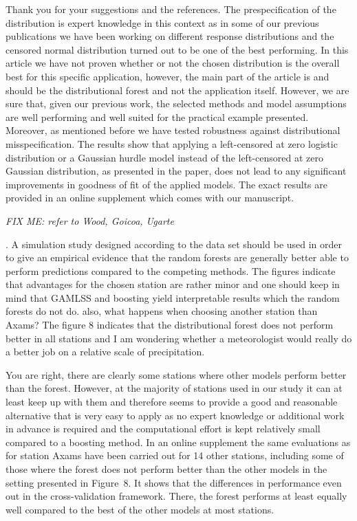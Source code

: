 \documentclass[american,foldmarks=false,noconfig]{uibklttr}
\newenvironment{review}{\fontshape{\itdefault}\fontseries{\bfdefault} \selectfont \smallskip}{\par}
\begin{document}
Thank you for your suggestions and the references. 
The prespecification of the distribution is expert knowledge in 
this context as in some of our previous publications we have been 
working on different response distributions and the censored normal 
distribution turned out to be one of the best performing. In this article 
we have not proven whether or not the chosen distribution is the overall
best for this specific application, however, the main part of the article 
is and should be the distributional forest and not the application itself. 
However, we are sure that, given our previous work, the selected methods 
and model assumptions are well performing and well suited for the practical 
example presented.
Moreover, as mentioned before we have tested robustness against 
distributional misspecification. The results show that applying a 
left-censored at zero logistic distribution or a Gaussian hurdle model 
instead of the left-censored at zero Gaussian distribution, as presented 
in the paper, does not lead to any significant improvements in goodness of 
fit of the applied models. The exact results are provided in an online 
supplement which comes with our manuscript.

\textit{FIX ME: refer to Wood, Goicoa, Ugarte}


\begin{review}
6. A simulation study designed according to the data set should 
be used in order to give an empirical evidence that the random 
forests are generally better able to perform predictions compared 
to the competing methods. The figures indicate that advantages 
for the chosen station are rather minor and one should keep in 
mind that GAMLSS and boosting yield interpretable results which 
the random forests do not do. also, what happens when choosing 
another station than Axams? The figure 8 indicates that the 
distributional forest does not perform better in all stations 
and I am wondering whether a meteorologist would really do a 
better job on a relative scale of precipitation.
\end{review}

You are right, there are clearly some stations where other models perform
better than the forest. However, at the majority of stations used in our study
it can at least keep up with them and therefore seems to provide a good and
reasonable alternative that is very easy to apply as no expert knowledge or
additional work in advance is required and the computational effort is kept
relatively small compared to a boosting method. In an online supplement the
same evaluations as for station Axams have been carried out for 14 other
stations, including some of those where the forest does not perform better than
the other models in the setting presented in Figure~8.  It shows that the
differences in performance even out in the cross-validation framework. There,
the forest performs at least equally well compared to the best of the other
models at most stations.
\end{document}
